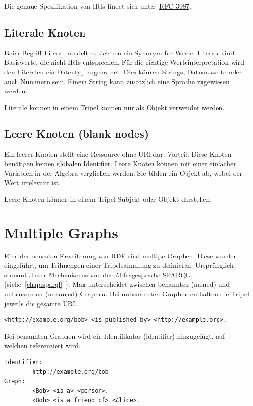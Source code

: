 Die genaue Spezifikation von IRIs findet sich unter~\href{http://www.ietf.org/rfc/rfc3987.txt}{RFC 3987}.

\subsection{Literale Knoten}
\label{sec:rdf_rdf_dataModel_literal}
Beim Begriff Literal handelt es sich um ein Synonym für Werte. Literale sind Basiswerte, die nicht IRIs entsprechen. Für die richtige Werteinterpretation wird den Literalen ein Datentyp zugeordnet. Dies können Strings, Datumswerte oder auch Nummern sein. Einem String kann zusätzlich eine Sprache zugewiesen werden.

Literale können in einem Tripel können nur als Objekt verwendet werden.

\subsection{Leere Knoten (blank nodes)}
\label{sec:rdf_rdf_dataModel_blankNodes}
Ein leerer Knoten stellt eine Ressource ohne URI dar. Vorteil:  Diese Knoten benötigen keinen globalen Identifier. Leere Knoten können mit einer einfachen Variablen in der Algebra verglichen werden. Sie bilden ein Objekt ab, wobei der Wert irrelevant ist.

Leere Knoten können in einem Tripel Subjekt oder Objekt darstellen.

\section{Multiple Graphs}
\label{sec:owlRdf_rdf_dataModel_multipleGraphs}
Eine der neuesten Erweiterung von RDF sind multipe Graphen. Diese wurden eingeführt, um Teilmengen einer Tripelsammlung zu definieren. Ursprünglich stammt dieser Mechanismus von der Abfragesprache SPARQL (siehe~\ref{chap:sparql}~). Man unterscheidet zwischen benannten (named) und unbenannten (unnamed) Graphen. Bei unbenannten Graphen enthalten die Tripel jeweils die gesamte URI.\@

\begin{lstlisting}[caption={Beispiel eines unbenannten (unnamed) Graphen}]
	<http://example.org/bob> <is published by> <http://example.org>.
\end{lstlisting}

Bei benannten Graphen wird ein Identifikator (identifier) hinzugefügt, auf welchen referenziert wird.

\begin{lstlisting}[caption={Beispiel eines benannten (named) Graphen}]
Identifier: 
		http://example.org/bob
Graph:
		<Bob> <is a> <person>.
		<Bob> <is a friend of> <Alice>.
\end{lstlisting}

